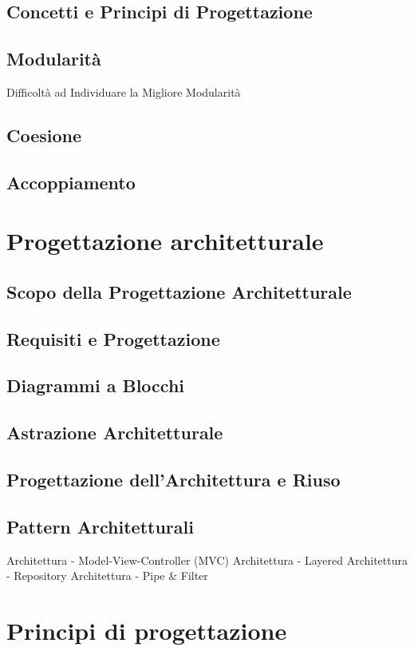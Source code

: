 \documentclass{article}
\begin{document}
	\subsection{Concetti e Principi di Progettazione}
	\subsection{Modularità}
	Difficoltà ad Individuare la Migliore Modularità
	\subsection{Coesione}
	\subsection{Accoppiamento}
	
	\section{Progettazione architetturale}
	\subsection{Scopo della Progettazione Architetturale}
	\subsection{Requisiti e Progettazione}
	\subsection{Diagrammi a Blocchi}
	\subsection{Astrazione Architetturale}
	\subsection{Progettazione dell’Architettura e Riuso}
	\subsection{Pattern Architetturali}
	Architettura - Model-View-Controller (MVC)
	Architettura - Layered
	Architettura - Repository
	Architettura - Pipe \& Filter
	
	\section{Principi di progettazione}
\end{document}
